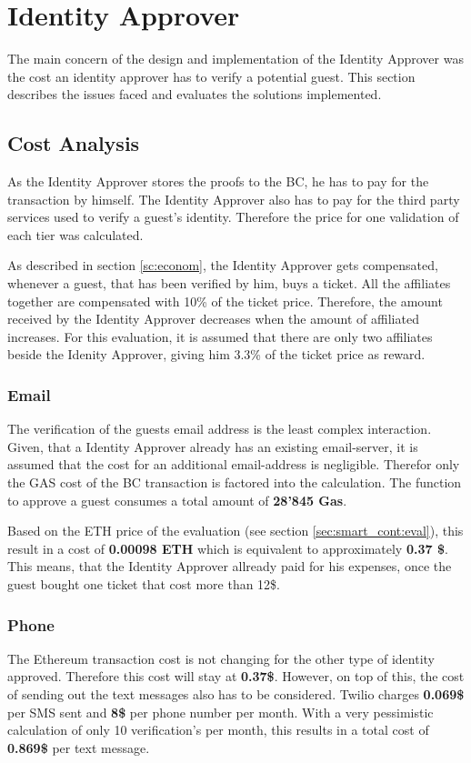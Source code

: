 \section{Identity Approver}\label{sec:identity-approver}
The main concern of the design and implementation of the Identity Approver was the cost an identity approver has to verify a potential guest. This section describes the issues faced and evaluates the solutions implemented.

\subsection{Cost Analysis}
As the Identity Approver stores the proofs to the BC, he has to pay for the transaction by himself. The Identity Approver also has to pay for the third party services used to verify a guest's identity. Therefore the price for one validation of each tier was calculated.

As described in section \ref{sc:econom}, the Identity Approver gets compensated, whenever a guest, that has been verified by him, buys a ticket. All the affiliates together are compensated with 10\% of the ticket price. Therefore, the amount received by the Identity Approver decreases when the amount of affiliated increases. For this evaluation, it is assumed that there are only two affiliates beside the Idenity Approver, giving him 3.3\% of the ticket price as reward.

\subsubsection{Email}
The verification of the guests email address is the least complex interaction. Given, that a Identity Approver already has an existing email-server, it is assumed that the cost for an additional email-address is negligible. Therefor only the GAS cost of the BC transaction is factored into the calculation. The function to approve a guest consumes a total amount of \textbf{28'845 Gas}. 

Based on the ETH price of the evaluation (see section \ref{sec:smart_cont:eval}), this result in a cost of \textbf{0.00098 ETH} which is equivalent to approximately \textbf{0.37 \$}. This means, that the Identity Approver allready paid for his expenses, once the guest bought one ticket that cost more than 12\$. 

\subsubsection{Phone}
The Ethereum transaction cost is not changing for the other type of identity approved. Therefore this cost will stay at \textbf{0.37\$}. However, on top of this, the cost of sending out the text messages also has to be considered. Twilio charges \textbf{0.069\$} per SMS sent and \textbf{8\$} per phone number per month\cite{twillio-Cost}. With a very pessimistic calculation of only 10 verification's per month, this results in a total cost of \textbf{0.869\$} per text message.

